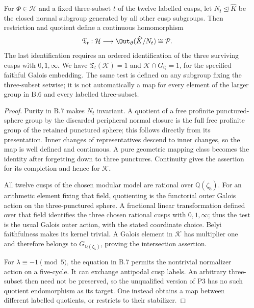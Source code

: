 For \(\Phi\in\mathcal H\) and a fixed three-subset \(t\) of the
twelve labelled cusps, let \(N_t\trianglelefteq\widehat K\) be
the closed normal subgroup generated by all other cusp subgroups.
Then restriction and quotient define a continuous homomorphism
\[
 \mathfrak T_t:\mathcal H\longrightarrow
 \Out_{\partial}(\widehat K/N_t)\cong\mathcal P.
\]
The last identification requires an ordered identification of the
three surviving cusps with \(0,1,\infty\). We have
\(\mathfrak T_t(\mathcal K)=1\) and
\(\mathcal K\cap G_{\mathbb Q}=1\), for the specified faithful
Galois embedding. The same test is defined on any subgroup fixing
the three-subset setwise; it is not automatically a map for every
element of the larger group in B.6 and every labelled three-subset.
\begin{proof}
Purity in B.7 makes \(N_t\) invariant. A quotient of a free
profinite punctured-sphere group by the discarded peripheral normal
closure is the full free profinite group of the retained punctured
sphere; this follows directly from its presentation. Inner changes
of representatives descend to inner changes, so the map is well
defined and continuous. A pure geometric mapping class becomes the
identity after forgetting down to three punctures. Continuity gives
the assertion for its completion and hence for \(\mathcal K\).

All twelve cusps of the chosen modular model are rational over
\(\mathbb Q(\zeta_5)\). For an arithmetic element fixing that
field, quotienting is the functorial outer Galois action on the
three-punctured sphere. A fractional linear transformation defined
over that field identifies the three chosen rational cusps with
\(0,1,\infty\); thus the test is the usual Galois outer action,
with the stated coordinate choice. Belyi faithfulness makes its
kernel trivial. A Galois element in \(\mathcal K\) has multiplier
one and therefore belongs to \(G_{\mathbb Q(\zeta_5)}\), proving
the intersection assertion.

For \(\lambda\equiv-1\pmod5\), the equation in B.7 permits the
nontrivial normalizer action on a five-cycle. It can exchange
antipodal cusp labels. An arbitrary three-subset then need not be
preserved, so the unqualified version of P3 has no such quotient
endomorphism as its target. One instead obtains a map between
different labelled quotients, or restricts to their stabilizer.
\end{proof}

